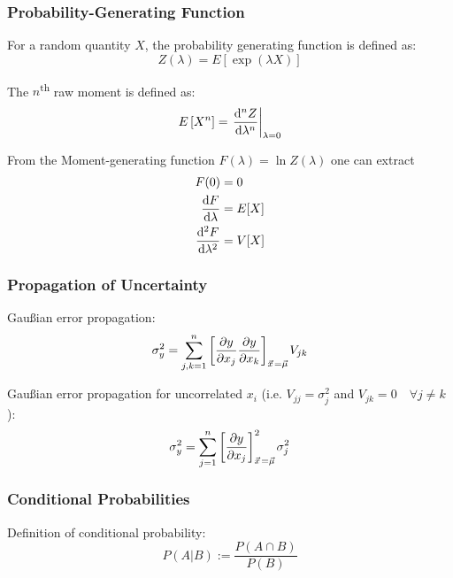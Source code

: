 		\subsubsection{Probability-Generating Function}
			\noindent
			For a random quantity $X$, the probability generating function is defined as:
			\begin{equation}
				Z(\lambda) = E\left[ \exp(\lambda X) \right]
			\end{equation}

			\noindent
			The $n$\textsuperscript{th} raw moment is defined as:
			\begin{equation}
				E\left[X^n\right] = \eval{\dv[n]{Z}{\lambda}}_{\lambda=0}
			\end{equation}

			\noindent
			From the Moment-generating function $F(\lambda)=\ln Z(\lambda)$ one can extract
			\begin{equation}
				\begin{aligned}
					F(0) &= 0 \\
					\dv{F}{\lambda}(0) &= E\qty[X] \\
					\dv[2]{F}{\lambda}(0) &= V\qty[X] \\
				\end{aligned}
			\end{equation}


		\subsubsection{Propagation of Uncertainty}
			\noindent
			Gaußian error propagation:
			\begin{equation}
				\sigma_y^2 = \sum_{j,k=1}^n \qty[\pdv{y}{x_j}\pdv{y}{x_k}]_{\vec{x}=\vec{\mu}} V_{jk}
			\end{equation}

			\noindent
			Gaußian error propagation for uncorrelated  $x_i$ (i.e. $V_{jj} = \sigma_{j}^2$ and $V_{jk} = 0 \quad\forall j\ne k$):
			\begin{equation}
				\sigma_y^2 = \sum_{j=1}^n \qty[\pdv{y}{x_j}]^2_{\vec{x}=\vec{\mu}} \sigma_j^2
			\end{equation}


		\subsubsection{Conditional Probabilities}
			\noindent
			Definition of conditional probability:
			\begin{equation}
				P(A|B) := \frac{P(A \cap B)}{P(B)}
			\end{equation}

